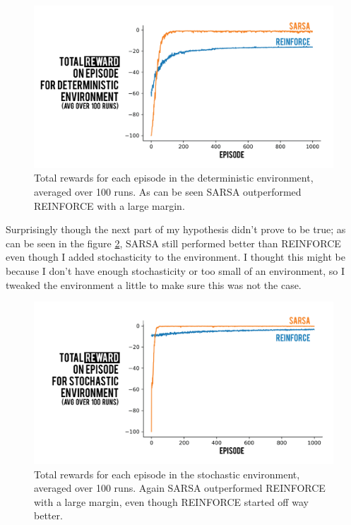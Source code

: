 \documentclass[10pt, letterpaper, twocolumn]{article}
\begin{document}
	\begin{figure}[h]
		\centering
		\includegraphics[width=\linewidth]{figure_deterministic}
		\caption{\small Total rewards for each episode in the deterministic environment, averaged over 100 runs. As can be seen SARSA outperformed REINFORCE with a large margin.}
		\label{fig:deterministic}
	\end{figure}
	
	Surprisingly though the next part of my hypothesis didn't prove to be true; as can be seen in the figure \ref{fig:stochastic}, SARSA still performed better than REINFORCE even though I added stochasticity to the environment. I thought this might be because I don't have enough stochasticity or too small of an environment, so I tweaked the environment a little to make sure this was not the case. 
	
	\begin{figure}[h]
		\centering
		\includegraphics[width=\linewidth]{figure_stochastic}
		\caption{\small Total rewards for each episode in the stochastic environment, averaged over 100 runs. Again SARSA outperformed REINFORCE with a large margin, even though REINFORCE started off way better.}
		\label{fig:stochastic}
	\end{figure}
\end{document}
